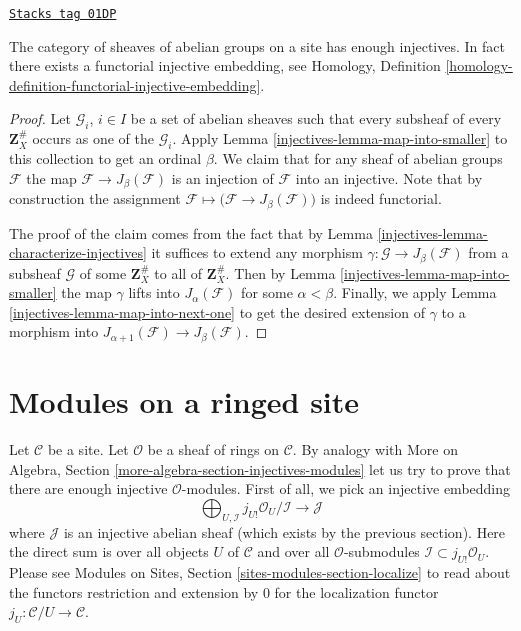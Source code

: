 \begin{theorem}
\label{injectives-theorem-sheaves-injectives}
\href{https://stacks.math.columbia.edu/tag/01DP}{\texttt{Stacks tag 01DP}}

The category of sheaves of abelian groups on a
site has enough injectives. In fact there exists
a functorial injective embedding, see
Homology, Definition \ref{homology-definition-functorial-injective-embedding}.
\end{theorem}

\begin{proof}

Let $\mathcal{G}_i$, $i \in I$ be a set of abelian
sheaves such that every subsheaf of every $\mathbf{Z}_X^\#$
occurs as one of the $\mathcal{G}_i$. Apply
Lemma \ref{injectives-lemma-map-into-smaller} to this collection to
get an ordinal $\beta$. We claim that for any sheaf of abelian
groups $\mathcal{F}$ the map $\mathcal{F} \to J_\beta(\mathcal{F})$
is an injection of $\mathcal{F}$ into an injective.
Note that by construction the assignment
$\mathcal{F} \mapsto \big(\mathcal{F} \to J_\beta(\mathcal{F})\big)$
is indeed functorial.

\medskip\noindent
The proof of the claim comes from the fact that by
Lemma \ref{injectives-lemma-characterize-injectives} it suffices to extend any
morphism $\gamma : \mathcal{G} \to J_\beta(\mathcal{F})$
from a subsheaf $\mathcal{G}$ of some $\mathbf{Z}_X^\#$ to all of
$\mathbf{Z}_X^\#$. Then by Lemma \ref{injectives-lemma-map-into-smaller} the
map $\gamma$ lifts into $J_\alpha(\mathcal{F})$ for some
$\alpha < \beta$. Finally, we apply Lemma \ref{injectives-lemma-map-into-next-one}
to get the desired extension of $\gamma$ to a morphism
into $J_{\alpha + 1}(\mathcal{F}) \to J_\beta(\mathcal{F})$.
\end{proof}

\section{Modules on a ringed site}
\label{injectives-section-sheaves-modules}
Let $\mathcal{C}$ be a site.
Let $\mathcal{O}$ be a sheaf of rings on $\mathcal{C}$.
By analogy with
More on Algebra, Section \ref{more-algebra-section-injectives-modules}
let us try to prove that there are enough injective
$\mathcal{O}$-modules. First of all, we pick an injective
embedding
$$
\bigoplus\nolimits_{U, \mathcal{I}}
j_{U!}\mathcal{O}_U/\mathcal{I}
\longrightarrow
\mathcal{J}
$$
where $\mathcal{J}$ is an injective abelian sheaf (which
exists by the previous section). Here the direct sum is
over all objects $U$ of $\mathcal{C}$ and over all
$\mathcal{O}$-submodules $\mathcal{I} \subset j_{U!}\mathcal{O}_U$.
Please see
Modules on Sites, Section \ref{sites-modules-section-localize}
to read about the functors restriction and
extension by $0$ for the localization functor
$j_U : \mathcal{C}/U \to \mathcal{C}$.

